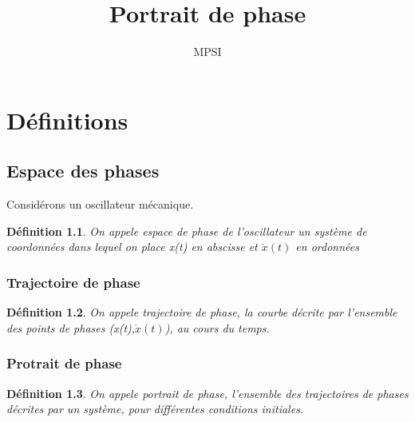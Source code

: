 \documentclass[a4paper,12pt,oneside]{report}
\title{Portrait de phase}
\author{MPSI}
\newtheorem{de}{Définition}
\begin{document}
\maketitle
\chapter{Définitions}
\section{Espace des phases}
Considérons un oscillateur mécanique.
\begin{de}
On appele espace de phase de l'oscillateur un système de coordonnées dans lequel on place x(t) en abscisse et $\mathring{x}(t)$ en ordonnées
\end{de}
\subsection{Trajectoire de phase}
\begin{de}
On appele trajectoire de phase, la courbe décrite par l'ensemble des points de phases (x(t),$\mathring{x}(t)$), au cours du temps.
\end{de}
\subsection{Protrait de phase}
\begin{de}
On appele portrait de phase, l'ensemble des trajectoires de phases décrites par un système, pour différentes conditions initiales.
\end{de}
\end{document}
